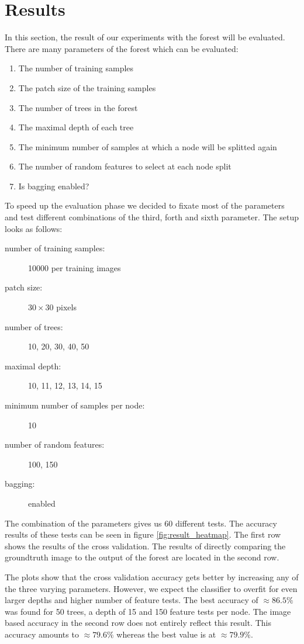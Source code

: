 \section{Results}
\label{sec:results}

In this section, the result of our experiments with the forest will be evaluated. There are many parameters
of the forest which can be evaluated:

\FloatBarrier
\begin{enumerate}
	\item The number of training samples
	\item The patch size of the training samples
	\item The number of trees in the forest
	\item The maximal depth of each tree
	\item The minimum number of samples at which a node will be splitted again
	\item The number of random features to select at each node split
	\item Is bagging enabled?
\end{enumerate}
\FloatBarrier

To speed up the evaluation phase we decided to fixate most of the parameters and test different combinations
of the third, forth and sixth parameter. The setup looks as follows:

\FloatBarrier
\begin{description}
	\item[number of training samples:] 10000 per training images
	\item[patch size:] $30 \times 30$ pixels
	\item[number of trees:] 10, 20, 30, 40, 50
	\item[maximal depth:] 10, 11, 12, 13, 14, 15
	\item[minimum number of samples per node:] 10
	\item[number of random features:] 100, 150
	\item[bagging:] enabled
\end{description}
\FloatBarrier

The combination of the parameters gives us 60 different tests. The accuracy results of these tests can be seen
in figure \ref{fig:result_heatmap}. The first row shows the results of the cross validation. The results
of directly comparing the groundtruth image to the output of the forest are located in the second row. 

The plots show that the cross validation accuracy gets better by increasing any of the three varying parameters.
However, we expect the classifier to overfit for even larger depths and higher number of feature tests. The best
accuracy of $\approx 86.5\%$ was found for 50 trees, a depth of 15 and 150 feature tests per node. The image based
accuracy in the second row does not entirely reflect this result. This accuracy amounts to $\approx 79.6\%$ whereas
the best value is at $\approx 79.9\%$.

